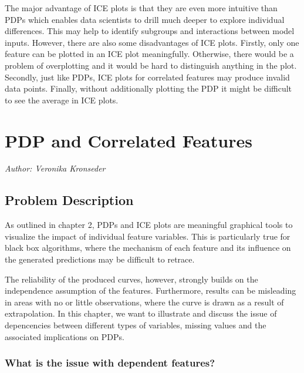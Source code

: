 \documentclass[
]{krantz}
\begin{document}
The major advantage of ICE plots is that they are even more intuitive than PDPs which enables data scientists to drill much deeper to explore individual differences. This may help to identify subgroups and interactions between model inputs. However, there are also some disadvantages of ICE plots. Firstly, only one feature can be plotted in an ICE plot meaningfully. Otherwise, there would be a problem of overplotting and it would be hard to distinguish anything in the plot. Secondly, just like PDPs, ICE plots for correlated features may produce invalid data points. Finally, without additionally plotting the PDP it might be difficult to see the average in ICE plots.\citep{molnar2019}

\hypertarget{pdp-and-correlated-features}{%
\chapter{PDP and Correlated Features}\label{pdp-and-correlated-features}}

\emph{Author: Veronika Kronseder}

\hypertarget{ProblemDescription}{%
\section{Problem Description}\label{ProblemDescription}}

As outlined in chapter 2, PDPs and ICE plots are meaningful graphical tools to visualize the impact of individual feature variables. This is particularly true for black box algorithms, where the mechanism of each feature and its influence on the generated predictions may be difficult to retrace.\citep{Goldstein2013}

The reliability of the produced curves, however, strongly builds on the independence assumption of the features. Furthermore, results can be misleading in areas with no or little observations, where the curve is drawn as a result of extrapolation. In this chapter, we want to illustrate and discuss the issue of depencencies between different types of variables, missing values and the associated implications on PDPs.

\hypertarget{what-is-the-issue-with-dependent-features}{%
\subsection{What is the issue with dependent features?}\label{what-is-the-issue-with-dependent-features}}
\end{document}
